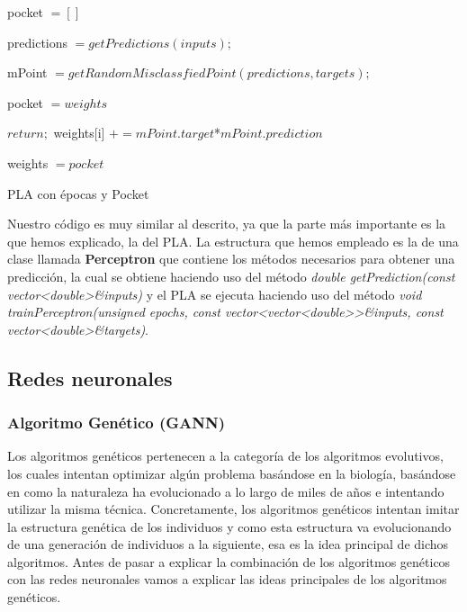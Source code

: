 \newpage
\begin{algorithm}[H]
    pocket $= []$
    
    {
        predictions $= getPredictions(inputs);$
        
        mPoint $= getRandomMisclassfiedPoint(predictions, targets);$
        
        {
            pocket $= weights$
        }
        
        {
    		$return;$
    	}
    	{
            {
                weights[i] $+= mPoint.target$*$mPoint.prediction$
            }
    	}
	}
	
	{
	    weights $= pocket$
	}
	\caption{PLA con épocas y Pocket}
	\label{alg:plawithepochsandpocket}
\end{algorithm}
\vspace{2mm}

Nuestro código es muy similar al descrito, ya que la parte más importante es la que hemos explicado, la del PLA. La estructura que hemos empleado es la de una clase llamada \textbf{Perceptron} que contiene los métodos necesarios para obtener una predicción, la cual se obtiene haciendo uso del método \textit{double getPrediction(const vector\textless double\textgreater \&inputs)} y el PLA se ejecuta haciendo uso del método \textit{void trainPerceptron(unsigned epochs, const vector\textless vector\textless double\textgreater \textgreater \&inputs, const vector\textless double\textgreater \&targets)}.

\newpage
\subsection{Redes neuronales}
\label{subsec:nn}


\newpage
\subsubsection{Algoritmo Genético (GANN)}
\label{subsubsec:nn:gann}

Los algoritmos genéticos pertenecen a la categoría de los algoritmos evolutivos, los cuales intentan optimizar algún problema basándose en la biología, basándose en como la naturaleza ha evolucionado a lo largo de miles de años e intentando utilizar la misma técnica. Concretamente, los algoritmos genéticos intentan imitar la estructura genética de los individuos y como esta estructura va evolucionando de una generación de individuos a la siguiente, esa es la idea principal de dichos algoritmos. Antes de pasar a explicar la combinación de los algoritmos genéticos con las redes neuronales vamos a explicar las ideas principales de los algoritmos genéticos.

